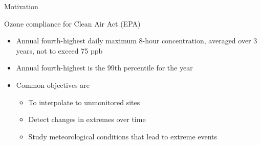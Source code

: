 \documentclass{beamer}
\begin{document}
\begin{frame}{Motivation}
\begin{adjustwidth}{1em}{0em}
  Ozone compliance for Clean Air Act (EPA) \vspace{1em}
  \begin{itemize} \setlength{\itemsep}{1em}
    \item Annual fourth-highest daily maximum 8-hour concentration, averaged over 3 years, not to exceed 75 ppb
    \item Annual fourth-highest is the 99th percentile for the year
    \item Common objectives are \vspace{0.5em}
    \begin{itemize} \setlength{\itemsep}{0.5em}
      \item To interpolate to unmonitored sites
      \item Detect changes in extremes over time
      \item Study meteorological conditions that lead to extreme events
    \end{itemize}
  \end{itemize}
\end{adjustwidth}
\end{frame}
\end{document}
